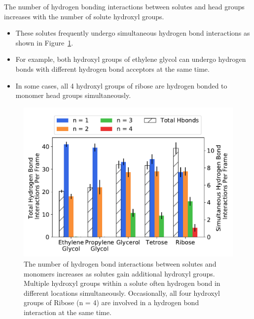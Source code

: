 \documentclass{article}
\begin{document}
  The number of hydrogen bonding interactions between solutes and head groups
  increases with the number of solute hydroxyl groups.
  \begin{itemize}
    \item These solutes frequently undergo simultaneous hydrogen bond interactions as
    shown in Figure~\ref{fig:multi_hbonds}. 
    \item For example, both hydroxyl groups of ethylene glycol can undergo hydrogen
    bonds with different hydrogen bond acceptors at the same time.
    \item In some cases, all 4 hydroxyl groups of ribose are hydrogen bonded to monomer
    head groups simultaneously.
  \end{itemize}
  
  \begin{figure}[!htb]
  \centering
  \includegraphics[width=\linewidth]{multi_hbonds.pdf}
  \caption{The number of hydrogen bond interactions between solutes and monomers increases
  as solutes gain additional hydroxyl groups. Multiple hydroxyl groups within a solute often
  hydrogen bond in different locations simultaneously. Occasionally, all four hydroxyl groups
  of Ribose (n = 4) are involved in a hydrogen bond interaction at the same time.}\label{fig:multi_hbonds}
  \end{figure}
  
\end{document}
